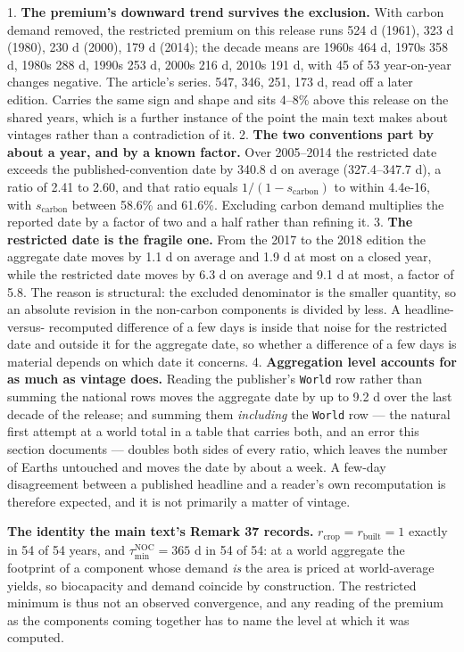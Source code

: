 \documentclass[11pt]{article}
\begin{document}
1. \textbf{The premium's downward trend survives the exclusion.} With carbon demand removed, the restricted premium on this release runs 524 d (1961), 323 d (1980), 230 d (2000), 179 d (2014); the decade means are 1960s 464 d, 1970s 358 d, 1980s 288 d, 1990s 253 d, 2000s 216 d, 2010s 191 d, with 45 of 53 year-on-year changes negative. The article's series. 547, 346, 251, 173 d, read off a later edition. Carries the same sign and shape and sits 4--8\% above this release on the shared years, which is a further instance of the point the main text makes about vintages rather than a contradiction of it. 2. \textbf{The two conventions part by about a year, and by a known factor.} Over 2005--2014 the restricted date exceeds the published-convention date by 340.8 d on average (327.4--347.7 d), a ratio of 2.41 to 2.60, and that ratio equals \(1/(1-s_{\mathrm{carbon}})\) to within 4.4e-16, with \(s_{\mathrm{carbon}}\) between 58.6\% and 61.6\%. Excluding carbon demand multiplies the reported date by a factor of two and a half rather than refining it. 3. \textbf{The restricted date is the fragile one.} From the 2017 to the 2018 edition the aggregate date moves by 1.1 d on average and 1.9 d at most on a closed year, while the restricted date moves by 6.3 d on average and 9.1 d at most, a factor of 5.8. The reason is structural: the excluded denominator is the smaller quantity, so an absolute revision in the non-carbon components is divided by less. A headline-versus- recomputed difference of a few days is inside that noise for the restricted date and outside it for the aggregate date, so whether a difference of a few days is material depends on which date it concerns. 4. \textbf{Aggregation level accounts for as much as vintage does.} Reading the publisher's \texttt{World} row rather than summing the national rows moves the aggregate date by up to 9.2 d over the last decade of the release; and summing them \emph{including} the \texttt{World} row --- the natural first attempt at a world total in a table that carries both, and an error this section documents --- doubles both sides of every ratio, which leaves the number of Earths untouched and moves the date by about a week. A few-day disagreement between a published headline and a reader's own recomputation is therefore expected, and it is not primarily a matter of vintage.

\textbf{The identity the main text's Remark 37 records.} \(r_{\mathrm{crop}} = r_{\mathrm{built}} = 1\) exactly in 54 of 54 years, and \(\tau_{\min}^{\mathrm{NOC}} = 365\) d in 54 of 54: at a world aggregate the footprint of a component whose demand \emph{is} the area is priced at world-average yields, so biocapacity and demand coincide by construction. The restricted minimum is thus not an observed convergence, and any reading of the premium as the components coming together has to name the level at which it was computed.
\end{document}
